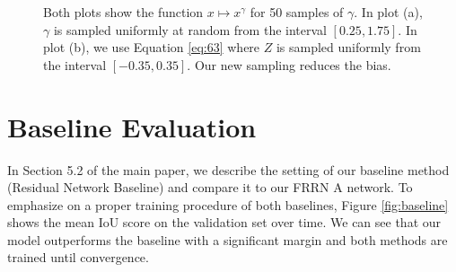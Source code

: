 \documentclass[10pt,twocolumn,letterpaper]{article}
\begin{document}
\begin{figure}[t]
\begin{subfigure}{0.48\linewidth}
{}
					\caption{}
					\label{fig:gamma_b}
				\end{subfigure}%
				\caption{
					Both plots show the function $x \mapsto x^\gamma$ for 50 samples of $\gamma$.
					In plot (a), $\gamma$ is sampled uniformly at random from the interval $[0.25, 1.75]$.
					In plot (b), we use Equation \ref{eq:63} where $Z$ is sampled uniformly from the interval $[-0.35, 0.35]$.
					Our new sampling reduces the bias.
					}
				\label{fig:gamma}
			\end{figure}

\section{Baseline Evaluation}
In Section 5.2 of the main paper, we describe the setting of our baseline method (Residual Network Baseline) and compare it to our FRRN A network. 
To emphasize on a proper training procedure of both baselines, Figure \ref{fig:baseline} shows the mean IoU score on the validation set over time. 
We can see that our model outperforms the baseline with a significant margin and both methods are trained until convergence.
\end{document}
